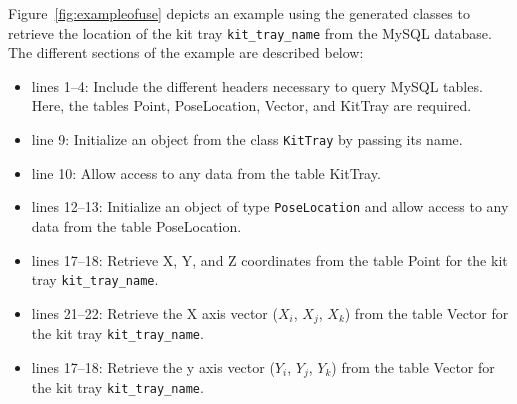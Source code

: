 Figure~\ref{fig:exampleofuse} depicts an example using the generated classes to retrieve the location of the kit tray \texttt{kit\_tray\_name} from the MySQL database. The different sections of the example are described below:

\begin{itemize}
\item lines \textcolor{BrickRed}{1--4}: Include the different headers necessary to query MySQL tables. Here, the tables Point, PoseLocation, Vector, and KitTray are required.
\item line \textcolor{BrickRed}{9}: Initialize an object from the class \texttt{KitTray} by passing its name.
\item line \textcolor{BrickRed}{10}: Allow access to any data from the table KitTray.
\item lines \textcolor{BrickRed}{12--13}: Initialize an object of type \texttt{PoseLocation} and allow access to any data from the table PoseLocation.
\item lines \textcolor{BrickRed}{17--18}: Retrieve X, Y, and Z coordinates from the table Point for the kit tray \texttt{kit\_tray\_name}.
\item lines \textcolor{BrickRed}{21--22}: Retrieve the X axis vector ($X_i$, $X_j$, $X_k$) from the table Vector for the kit tray \texttt{kit\_tray\_name}.
\item lines \textcolor{BrickRed}{17--18}: Retrieve the y axis vector ($Y_i$, $Y_j$, $Y_k$) from the table Vector for the kit tray \texttt{kit\_tray\_name}.
\end{itemize}


